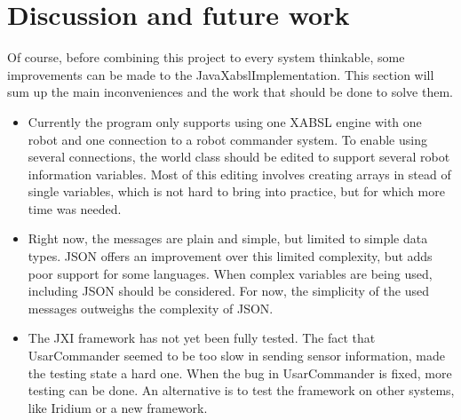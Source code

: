 \documentclass[a4paper,10pt]{article}
\begin{document}
\section{Discussion and future work}
Of course, before combining this project to every system thinkable, some
improvements can be made to the JavaXabslImplementation. This section will sum
up the main inconveniences and the work that should be done to solve them.
\begin{itemize}
    \item {} Currently the program only supports using one
    XABSL engine with one robot and one connection to a robot commander system.
    To enable using several connections, the world class should be edited to
    support several robot information variables. Most of this editing involves
    creating arrays in stead of single variables, which is not hard to bring
    into practice, but for which more time was needed.
    \item {} Right now, the messages are plain and simple, but
    limited to simple data types. JSON offers an improvement over this limited
    complexity, but adds poor support for some languages. When complex variables
    are being used, including JSON should be considered. For now, the simplicity
    of the used messages outweighs the complexity of JSON.
    \item {} The JXI framework has not yet been fully tested. The
    fact that UsarCommander seemed to be too slow in sending sensor information,
    made the testing state a hard one. When the bug in UsarCommander is fixed,
    more testing can be done. An alternative is to test the framework on other
    systems, like Iridium or a new framework.
\end{itemize}


{}

\end{document}
